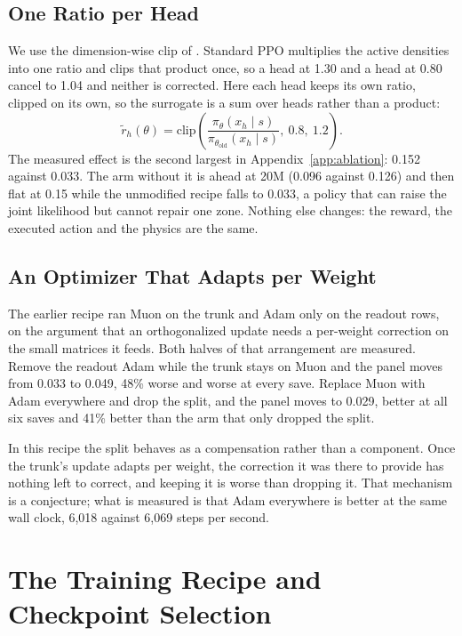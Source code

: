 \documentclass{article}
\begin{document}
\subsection{One Ratio per Head}
\label{app:ratio}

We use the dimension-wise clip of \citet{han2019dimension}. Standard PPO multiplies the active densities into one ratio and clips that product once, so a head at 1.30 and a head at 0.80 cancel to 1.04 and neither is corrected. Here each head keeps its own ratio, clipped on its own, so the surrogate is a sum over heads rather than a product:
\[
\tilde r_h(\theta) = \mathrm{clip}\!\left(\frac{\pi_\theta(x_h\mid s)}{\pi_{\theta_{\text{old}}}(x_h\mid s)},\ 0.8,\ 1.2\right).
\]
The measured effect is the second largest in Appendix~\ref{app:ablation}: 0.152 against 0.033. The arm without it is ahead at 20M (0.096 against 0.126) and then flat at 0.15 while the unmodified recipe falls to 0.033, a policy that can raise the joint likelihood but cannot repair one zone. Nothing else changes: the reward, the executed action and the physics are the same.

\subsection{An Optimizer That Adapts per Weight}
\label{app:adam}

The earlier recipe ran Muon on the trunk and Adam only on the readout rows, on the argument that an orthogonalized update needs a per-weight correction on the small matrices it feeds. Both halves of that arrangement are measured. Remove the readout Adam while the trunk stays on Muon and the panel moves from 0.033 to 0.049, 48\% worse and worse at every save. Replace Muon with Adam everywhere and drop the split, and the panel moves to 0.029, better at all six saves and 41\% better than the arm that only dropped the split.

In this recipe the split behaves as a compensation rather than a component. Once the trunk's update adapts per weight, the correction it was there to provide has nothing left to correct, and keeping it is worse than dropping it. That mechanism is a conjecture; what is measured is that Adam everywhere is better at the same wall clock, 6{,}018 against 6{,}069 steps per second.

\section{The Training Recipe and Checkpoint Selection}
\label{app:recipe}
\end{document}
